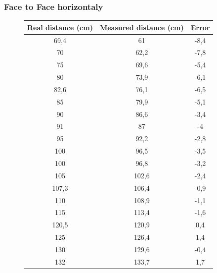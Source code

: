 \subsubsection{Face to Face horizontaly}
\begin{figure}[H]
  \centering

  \resizebox{0.5\linewidth}{!}{\FtFhorizontale}

  \vspace{1em}

  \small
  \setlength{\tabcolsep}{4pt}
  \begin{minipage}[t]{0.46\textwidth}
    \vspace{0pt}
    \centering
    \begin{tabular}{|c|c|c|}
      \hline
      Real distance (cm) & Measured distance (cm) & Error \\ \hline
      69,4  & 61    & -8,4 \\ \hline
      70    & 62,2  & -7,8 \\ \hline
      75    & 69,6  & -5,4 \\ \hline
      80    & 73,9  & -6,1 \\ \hline
      82,6  & 76,1  & -6,5 \\ \hline
      85    & 79,9  & -5,1 \\ \hline
      90    & 86,6  & -3,4 \\ \hline
      91    & 87    & -4   \\ \hline
      95    & 92,2  & -2,8 \\ \hline
      100   & 96,5  & -3,5 \\ \hline
      100   & 96,8  & -3,2 \\ \hline
      105   & 102,6 & -2,4 \\ \hline
      107,3 & 106,4 & -0,9 \\ \hline
      110   & 108,9 & -1,1 \\ \hline
      115   & 113,4 & -1,6 \\ \hline
      120,5 & 120,9 & 0,4  \\ \hline
      125   & 126,4 & 1,4  \\ \hline
      130   & 129,6 & -0,4 \\ \hline
      132   & 133,7 & 1,7  \\ \hline
    \end{tabular}
  \end{minipage}\hfill
  \begin{minipage}[t]{0.46\textwidth}

\end{minipage}
\end{figure}

